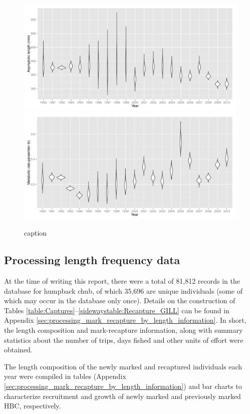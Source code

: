 \begin{figure}[htbp]
	\centering
		\includegraphics[width=6.5in]{../FIGS/LSMR/fig:LinfPosteriors.pdf}
		\includegraphics[width=6.5in]{../FIGS/LSMR/fig:kPosteriors.pdf}
	\caption{caption}
	\label{fig:FIGS_LSMR_fig:LinfPosteriors}
\end{figure}




\subsection{Processing length frequency data} %
\label{sub:processing_length_frequency_data}
At the time of writing this report, there were a total of 81,812 records in the database for humpback chub, of which 35,696 are unique individuals (some of which may occur in the database only once).  Details on the construction of Tables \ref{table:Captures}--\ref{sidewaystable:Recapture_GILL} can be found in Appendix \ref{sec:processing_mark_recapture_by_length_information}. In short, the length composition and mark-recapture information, along with summary statistics about the number of trips, days fished and other units of effort were obtained.

The length composition of the newly marked and recaptured individuals each year were compiled in tables (Appendix \ref{sec:processing_mark_recapture_by_length_information}) and bar charts to characterize recruitment and growth of newly marked and previously marked HBC, respectively.









